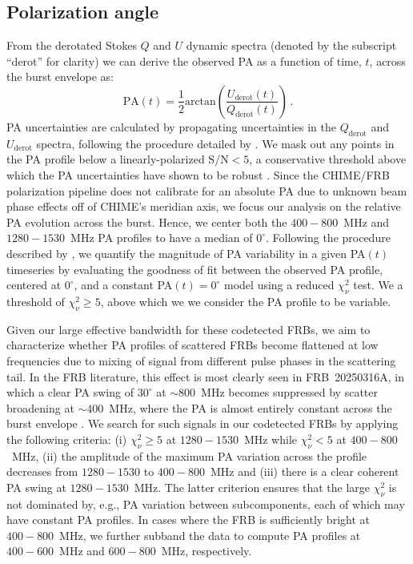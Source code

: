 \documentclass[twocolumn, linenumbers]{aastex701}
\begin{document}
\subsection{Polarization angle} \label{sec:models_pa}
From the derotated Stokes $Q$ and $U$ dynamic spectra (denoted by the subscript ``derot'' for clarity) we can derive the observed PA as a function of time, $t$, across the burst envelope as:
\begin{equation}
\mathrm{PA}(t) = \frac{1}{2} \mathrm{arctan} \left( \frac{U_\mathrm{derot}(t)}{Q_\mathrm{derot}(t)} \right)\,. \label{eq:pa}
\end{equation}
PA uncertainties are calculated by propagating uncertainties in the $Q_\mathrm{derot}$ and $U_\mathrm{derot}$ spectra, following the procedure detailed by \cite{2019ApJ...878...92V}. We mask out any points in the PA profile below a linearly-polarized $\mathrm{S/N} < 5$, a conservative threshold above which the PA uncertainties have shown to be robust \citep[see Appendix B by][]{2024ApJ...968...50P}. Since the CHIME/FRB polarization pipeline does not calibrate for an absolute PA due to unknown beam phase effects off of CHIME's meridian axis, we focus our analysis on the relative PA evolution across the burst. Hence, we center both the $400-800$~MHz and $1280-1530$~MHz PA profiles to have a median of $0^\circ$. Following the procedure described by \cite{2024ApJ...968...50P}, we quantify the magnitude of PA variability in a given PA$(t)$ timeseries by evaluating the goodness of fit between the observed PA profile, centered at $0^\circ$, and a constant PA$(t) = 0^\circ$ model using a reduced $\chi_\nu^2$ test. We a threshold of $\chi_\nu^2 \geq 5$, above which we we consider the PA profile to be variable.

Given our large effective bandwidth for these codetected FRBs, we aim to characterize whether PA profiles of scattered FRBs become flattened at low frequencies due to mixing of signal from different pulse phases in the scattering tail. In the FRB literature, this effect is most clearly seen in FRB~20250316A, in which a clear PA swing of $30^\circ$ at $\sim800$~MHz becomes suppressed by scatter broadening at $\sim 400$~MHz, where the PA is almost entirely constant across the burst envelope \citep[see Figure 5 by][]{2025ApJ...989L..48C}. We search for such signals in our codetected FRBs by applying the following criteria: (i) $\chi_\nu^2 \geq 5$ at $1280-1530$~MHz while $\chi_\nu^2 < 5$ at $400-800$~MHz, (ii) the amplitude of the maximum PA variation across the profile decreases from $1280-1530$ to $400-800$~MHz and (iii) there is a clear coherent PA swing at $1280-1530$~MHz. The latter criterion ensures that the large $\chi_\nu^2$ is not dominated by, e.g., PA variation between subcomponents, each of which may have constant PA profiles. In cases where the FRB is sufficiently bright at $400-800$~MHz, we further subband the data to compute PA profiles at $400-600$~MHz and $600-800$~MHz, respectively.
\end{document}
